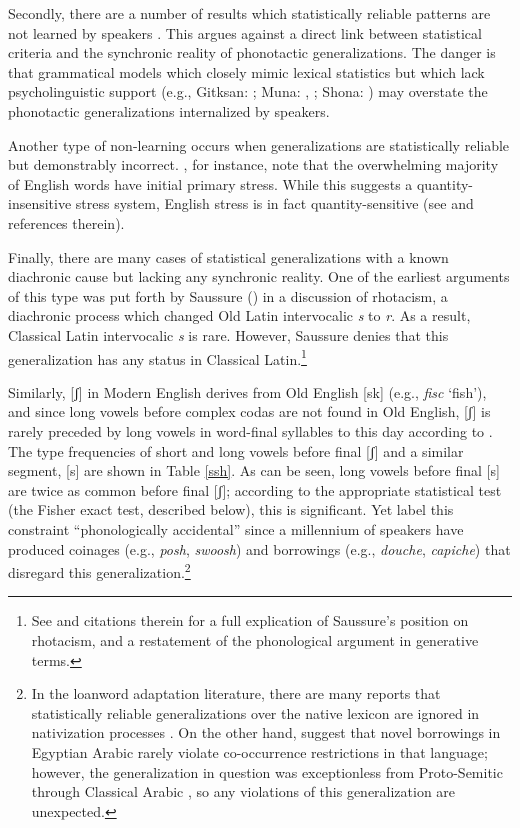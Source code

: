 Secondly, there are a number of results which statistically reliable patterns are not learned by speakers \citep[e.g.,][]{Becker2011,Hayes2006,Hayes2009,HayesInPress}. This argues against a direct link between statistical criteria and the synchronic reality of phonotactic generalizations. The danger is that grammatical models which closely mimic lexical statistics but which lack psycholinguistic support (e.g., Gitksan: \citealt{Brown2010}; Muna: \citealt{Anttila2008a}, \citealt{Coetzee2008a}; Shona: \citealt[][385]{Hayes2008a}) may overstate the phonotactic generalizations internalized by speakers. 

Another type of non-learning occurs when generalizations are statistically reliable but demonstrably incorrect. \citet{Legate2012}, for instance, note that the overwhelming majority of English words have initial primary stress. While this suggests a quantity-insensitive stress system, English stress is in fact quantity-sensitive (see \citealt{Halle1998c} and references therein). 

Finally, there are many cases of statistical generalizations with a known diachronic cause but lacking any synchronic reality. One of the earliest arguments of this type was put forth by Saussure (\citeyear[202f.]{CLG}) in a discussion of rhotacism, a diachronic process which changed Old Latin intervocalic \emph{s} to \emph{r}. As a result, Classical Latin intervocalic \emph{s} is rare. However, Saussure denies that this generalization has any status in Classical Latin.\footnote{See \citet{Gorman2012e} and citations therein for a full explication of Saussure's position on rhotacism, and a restatement of the phonological argument in generative terms.} 

Similarly, [ʃ] in Modern English derives from Old English [sk] (e.g., \emph{fisc} `fish'), and since long vowels before complex codas are not found in Old English, [ʃ] is rarely preceded by long vowels in word-final syllables to this day according to \citet{Iverson2005}. The type frequencies of short and long vowels before final [ʃ] and a similar segment, [s] are shown in Table \ref{ssh}. As can be seen, long vowels before final [s] are twice as common before final [ʃ]; according to the appropriate statistical test (the Fisher exact test, described below), this is significant. Yet \citet{Iverson2005} label this constraint ``phonologically accidental'' since a millennium of speakers have produced coinages (e.g., \emph{posh}, \emph{swoosh}) and  borrowings (e.g., \emph{douche}, \emph{capiche}) that disregard this generalization.\footnote{In the loanword adaptation literature, there are many reports that statistically reliable generalizations over the native lexicon are ignored in nativization processes \citep[e.g.,][]{Ito1995a,Ito1995b,Ussishkin2003}. On the other hand, \citet{Frisch2001} suggest that novel borrowings in Egyptian Arabic rarely violate co-occurrence restrictions in that language; however, the generalization in question was exceptionless from Proto-Semitic \citep{Ehret1989} through Classical Arabic \citep{Greenberg1950}, so any violations of this generalization are unexpected.}

